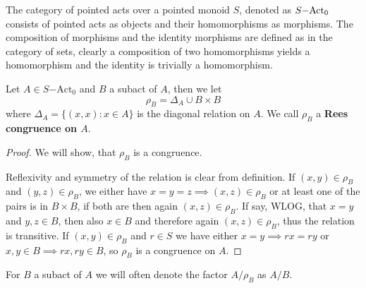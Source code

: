 \begin{remark}
    The category of pointed acts over a pointed monoid $S$, denoted as $S\mathrm{-Act}_0$ consists of pointed acts as objects and their homomorphisms as morphisms.
    The composition of morphisms and the identity morphisms are defined as in the category of sets, clearly a composition of two homomorphisms yields a homomorphism
    and the identity is trivially a homomorphism.
\end{remark}
\begin{definition}
    Let $A\in S\mathrm{-Act}_0$ and $B$ a subact of $A$, then we let 
    \[
        \rho_B = \Delta_A \cup B\times B
    \]
    where $\Delta_A= \{(x,x): x\in A \}$ is the diagonal relation on $A$. We call $\rho_B$ a \textbf{Rees congruence on $A$}. 
\end{definition}
\begin{proof}
    We will show, that $\rho_B$ is a congruence. \par 
    Reflexivity and symmetry of the relation is clear from definition. If $(x,y)\in\rho_B$ and $(y,z)\in\rho_B$, we either have 
    $x=y=z \implies (x,z)\in\rho_B$ or at least one of the pairs is in $B\times B$, if both are then again $(x,z)\in\rho_B$. If 
    say, WLOG, that $x=y$ and $y,z\in B$, then also $x\in B$ and therefore again $(x,z)\in\rho_B$, thus the relation is transitive. 
    If $(x,y)\in\rho_B$ and $r\in S$ we have either $x=y\implies rx=ry$ or $x,y\in B \implies rx,ry\in B$, so $\rho_B$ is a congruence on $A$.
\end{proof}
\begin{remark}
    For $B$ a subact of $A$ we will often denote the factor $A/\rho_B$ as $A/B$. 
\end{remark}

